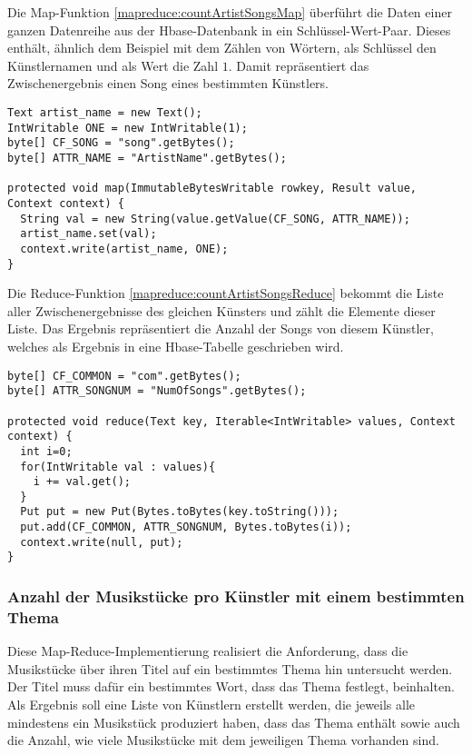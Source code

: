 Die Map-Funktion \ref{mapreduce:countArtistSongsMap} überführt die Daten einer ganzen
Datenreihe aus der Hbase-Datenbank in ein Schlüssel-Wert-Paar. Dieses enthält, ähnlich 
dem Beispiel mit dem Zählen von Wörtern, als Schlüssel den Künstlernamen und als Wert
die Zahl $1$. Damit repräsentiert das Zwischenergebnis einen Song eines bestimmten Künstlers.

\begin{lstlisting}[caption={Map-Funktion zur Anzahl der Musikstücke pro Künstler}, label=mapreduce:countArtistSongsMap]
Text artist_name = new Text();
IntWritable ONE = new IntWritable(1);
byte[] CF_SONG = "song".getBytes();
byte[] ATTR_NAME = "ArtistName".getBytes();

protected void map(ImmutableBytesWritable rowkey, Result value, Context context) {
  String val = new String(value.getValue(CF_SONG, ATTR_NAME));
  artist_name.set(val);
  context.write(artist_name, ONE);
}
\end{lstlisting}

Die Reduce-Funktion \ref{mapreduce:countArtistSongsReduce} bekommt die Liste aller
Zwischenergebnisse des gleichen Künsters und zählt die Elemente dieser Liste. Das Ergebnis
repräsentiert die Anzahl der Songs von diesem Künstler, welches als Ergebnis in eine 
Hbase-Tabelle geschrieben wird.

\begin{lstlisting}[caption={Reduce-Funktion zur Anzahl der Musikstücke pro Künstler}, label=mapreduce:countArtistSongsReduce]
byte[] CF_COMMON = "com".getBytes();
byte[] ATTR_SONGNUM = "NumOfSongs".getBytes();

protected void reduce(Text key, Iterable<IntWritable> values, Context context) {
  int i=0;
  for(IntWritable val : values){
    i += val.get();
  }          
  Put put = new Put(Bytes.toBytes(key.toString()));
  put.add(CF_COMMON, ATTR_SONGNUM, Bytes.toBytes(i));
  context.write(null, put);
}
\end{lstlisting}

\subsubsection{Anzahl der Musikstücke pro Künstler mit einem bestimmten Thema}
\label{mapred:sec:topicSongs}
Diese Map-Reduce-Implementierung realisiert die Anforderung, dass die Musikstücke über
ihren Titel auf ein bestimmtes Thema hin untersucht werden. Der Titel muss dafür ein bestimmtes
Wort, dass das Thema festlegt, beinhalten. Als Ergebnis soll eine Liste von Künstlern erstellt werden,
die jeweils alle mindestens ein Musikstück produziert haben, dass das Thema enthält sowie auch
die Anzahl, wie viele Musikstücke mit dem jeweiligen Thema vorhanden sind.

